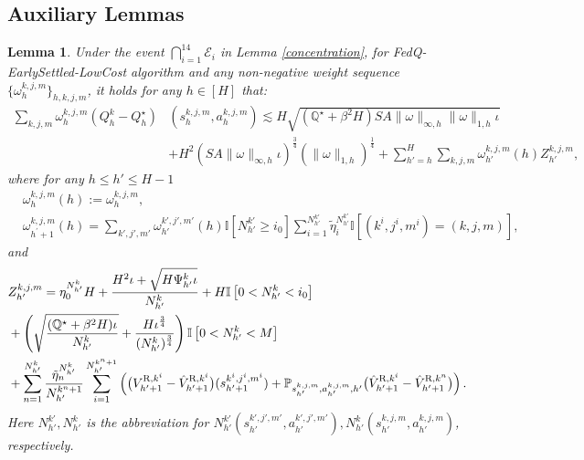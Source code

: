 \documentclass{article}
\newtheorem{lemma}{Lemma}[section]
\newcommand{\R}{\textnormal{R}}
\begin{document}
\subsection{Auxiliary Lemmas}
\begin{lemma}
\label{gaprecurQ}
Under the event $\bigcap_{i=1}^{14}\mathcal{E}_i$ in Lemma \ref{concentration}, for FedQ-EarlySettled-LowCost algorithm and any non-negative weight sequence $\{\omega_{h}^{k, j, m}\}_{h,k,j,m}$, it holds for any $h \in [H]$ that:
\begin{align*}
         \sum_{k,j,m} \omega_{h}^{k,j,m} \left(Q_h^k - Q_h^{\star}\right)&(s_h^{k,j,m}, a_h^{k,j,m}) \lesssim H\sqrt{(\mathbb{Q^{\star}}+\beta^2H)SA\|\omega\|_{\infty,h}\|\omega\|_{1,h}\iota}\\
         & + H^2(SA\|\omega\|_{\infty,h}\iota)^{\frac{3}{4}}(\|\omega\|_{1,h})^{\frac{1}{4}}  + \sum_{h' = h}^{H}\sum_{k,j,m} \omega_{h'}^{k,j,m}(h)Z_{h'}^{k,j,m},
\end{align*}
where for any $ h \leq h' \leq H-1$
\begin{align*}
    &\omega_{h}^{k,j,m}(h) := \omega_{h}^{k,j,m}, \nonumber\\  
    &\omega_{h^\prime+1}^{k,j,m}(h)  = \sum_{k',j',m'}\omega_{h'}^{k',j',m'}(h)\mathbb{I}\left[N_{h'}^{k'} \geq i_0 \right]\sum_{i = 1}^{N_{h'}^{k'}}\tilde{\eta}_i^{N_{h'}^{k'}}\mathbb{I}\left[(k^i,j^i,m^i) = (k,j,m) \right],
\end{align*} 
and
\begin{align}
\label{defZ}
    &Z_{h'}^{k,j,m} = \eta_0^{N_{h'}^k}H +\frac{H^2\iota+\sqrt{H\Psi_{h'}^k\iota}}{N_{h'}^k}+ H\mathbb{I}\left[0<N_{h'}^k<i_0 \right] \nonumber\\
    &+\left(\sqrt{\frac{(\mathbb{Q^{\star}}+\beta^2H)\iota}{N_{h'}^k}}+\frac{H\iota^{\frac{3}{4}}}{(N_{h'}^k)^{\frac{3}{4}}}\right)\mathbb{I}\left[ 0<N_{h'}^k< M\right] \nonumber\\
    &+\sum_{n=1}^{N_{h'}^k} \frac{\Tilde{\eta}_n^{N_{h'}^k}}{N_{h'}^{k^n+1}} \sum_{i=1}^{N_{h'}^{k^n+1}}\left(\big(V_{h'+1}^{\R,k^i}-\hat{V}_{h'+1}^{\R,k^i}\big)(s_{h'+1}^{k^i,j^i,m^i})+\mathbb{P}_{s_{h'}^{k,j,m}, a_{h'}^{k,j,m},h'}\big(\hat{V}_{h'+1}^{\R,k^i}-\hat{V}_{h'+1}^{\R,k^n}\big)\right).
\end{align}
Here $N_{h'}^{k'}, N_{h'}^k$ is the abbreviation for $N_{h'}^{k'}(s_{{h'}}^{k',j',m'},a_{{h'}}^{k',j',m'}), N_{h'}^k(s_{{h'}}^{k,j,m},a_{{h'}}^{k,j,m})$, respectively.
\end{lemma}
\end{document}
